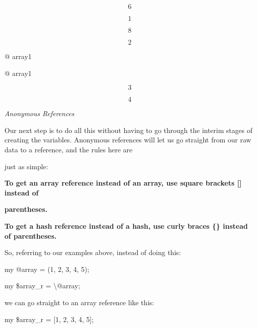 \documentclass[a4paper,11pt]{book}
\begin{document}
\[6\] 

\[1\] 

\[8\] 

\[2\] 


\noindent @ array1

\noindent 

\noindent 

\noindent 

\noindent @ array1

\noindent 

\[3\] 


\[4\] 


\noindent 

\noindent 

\noindent 

\noindent 

\noindent 

\noindent 

\noindent \textit{Anonymous References}

\noindent Our next step is to do all this without having to go through the interim stages of creating the variables. Anonymous references will let us go straight from our raw data to a reference, and the rules here are

\noindent just as simple:

\noindent 

\noindent 

\noindent \textbf{To get an array reference instead of an array, use square brackets [] instead of}

\noindent \textbf{parentheses.}

\noindent 

\noindent \textbf{To get a hash reference instead of a hash, use curly braces \{\} instead of parentheses.}

\noindent 

\noindent 

\noindent So, referring to our examples above, instead of doing this:

\noindent 

\noindent 

\noindent my @array = (1, 2, 3, 4, 5);

\noindent my \$array\_r = \textbackslash @array;

\noindent 

\noindent we can go straight to an array reference like this:

\noindent 

\noindent my \$array\_r = [1, 2, 3, 4, 5];
\end{document}
